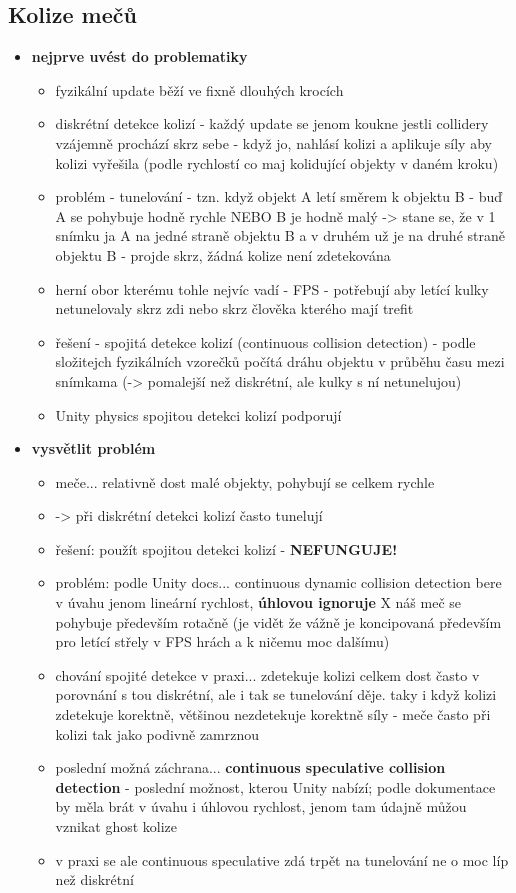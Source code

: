 \subsection{Kolize mečů} \label{swordCollisionsSection}
\begin{itemize}
  \item \textbf{nejprve uvést do problematiky}
  \begin{itemize}
    \item fyzikální update běží ve fixně dlouhých krocích
    \item diskrétní detekce kolizí - každý update se jenom koukne jestli collidery vzájemně prochází skrz sebe - když jo, nahlásí kolizi a aplikuje síly aby kolizi vyřešila (podle rychlostí co maj kolidující objekty v daném kroku)
    \item problém - tunelování - tzn. když objekt A letí směrem k objektu B - buď A se pohybuje hodně rychle NEBO B je hodně malý -> stane se, že v 1 snímku ja A na jedné straně objektu B a v druhém už je na druhé straně objektu B - projde skrz, žádná kolize není zdetekována
    \item herní obor kterému tohle nejvíc vadí - \acs{FPS} - potřebují aby letící kulky netunelovaly skrz zdi nebo skrz člověka kterého mají trefit
    \item řešení - spojitá detekce kolizí (continuous collision detection) - podle složitejch fyzikálních vzorečků počítá dráhu objektu v průběhu času mezi snímkama (-> pomalejší než diskrétní, ale kulky s ní netunelujou)
    \item Unity physics spojitou detekci kolizí podporují
  \end{itemize}
  \item \textbf{vysvětlit problém}
  \begin{itemize}
    \item meče... relativně dost malé objekty, pohybují se celkem rychle
    \item -> při diskrétní detekci kolizí často tunelují
    \item řešení: použít spojitou detekci kolizí - \textbf{NEFUNGUJE!}
    \item problém: podle Unity docs... continuous dynamic collision detection bere v úvahu jenom lineární rychlost, \textbf{úhlovou ignoruje} X náš meč se pohybuje především rotačně (je vidět že vážně je koncipovaná především pro letící střely v \acs{FPS} hrách a k ničemu moc dalšímu)
    \item chování spojité detekce v praxi... zdetekuje kolizi celkem dost často v porovnání s tou diskrétní, ale i tak se tunelování děje. taky i když kolizi zdetekuje korektně, většinou nezdetekuje korektně síly - meče často při kolizi tak jako podivně zamrznou 
    \item poslední možná záchrana... \textbf{continuous speculative collision detection} - poslední možnost, kterou Unity nabízí; podle dokumentace by měla brát v úvahu i úhlovou rychlost, jenom tam údajně můžou vznikat ghost kolize
    \item v praxi se ale continuous speculative zdá trpět na tunelování ne o moc líp než diskrétní 
  \end{itemize}
  

\end{itemize}
